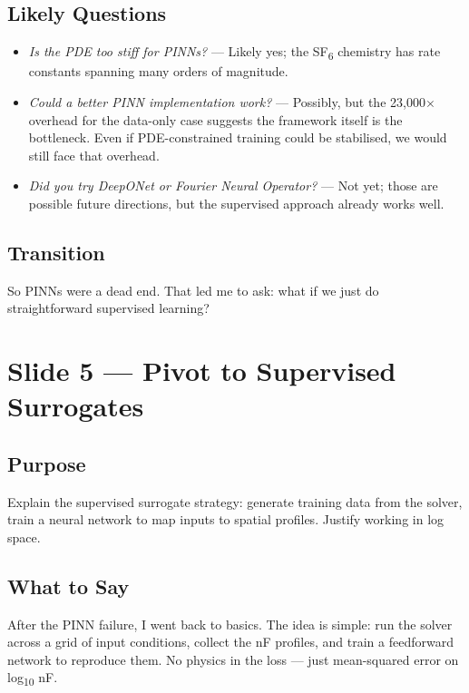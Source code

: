 \documentclass[12pt,a4paper]{article}
\begin{document}
\subsection*{Likely Questions}
\begin{itemize}
  \item \emph{Is the PDE too stiff for PINNs?}
    --- Likely yes; the SF\textsubscript{6} chemistry has rate
    constants spanning many orders of magnitude.
  \item \emph{Could a better PINN implementation work?}
    --- Possibly, but the 23,000$\times$ overhead for the data-only
    case suggests the framework itself is the bottleneck. Even if
    PDE-constrained training could be stabilised, we would still
    face that overhead.
  \item \emph{Did you try DeepONet or Fourier Neural Operator?}
    --- Not yet; those are possible future directions, but the
    supervised approach already works well.
\end{itemize}

\subsection*{Transition}
So PINNs were a dead end. That led me to ask: what if we just do
straightforward supervised learning?

\clearpage

\section{Slide 5 --- Pivot to Supervised Surrogates}
\label{sec:slide5}

\subsection*{Purpose}
Explain the supervised surrogate strategy: generate training data
from the solver, train a neural network to map inputs to spatial
profiles. Justify working in log space.

\subsection*{What to Say}

After the PINN failure, I went back to basics. The idea is simple:
run the solver across a grid of input conditions, collect the nF
profiles, and train a feedforward network to reproduce them. No
physics in the loss --- just mean-squared error on
log\textsubscript{10} nF.
\end{document}

